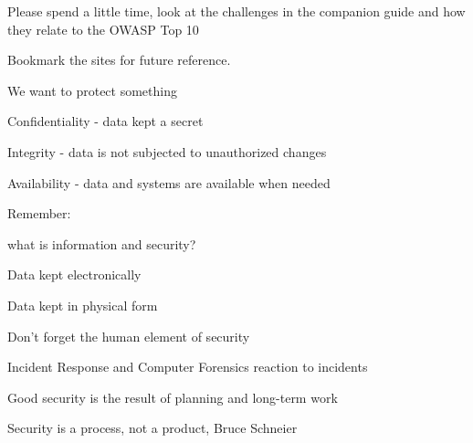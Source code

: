 \documentclass[Screen16to9,17pt]{foils}
\begin{document}
Please spend a little time, look at the challenges in the companion guide and how they relate to the OWASP Top 10

Bookmark the sites for future reference.






\begin{list1}
\item We want to protect something
\item Confidentiality - data kept a secret
\item Integrity - data is not subjected to unauthorized changes
\item Availability - data and systems are available when needed
\end{list1}


\begin{list1}
\item Remember:
\begin{list2}
\item what is information and security?
\item Data kept electronically
\item Data kept in physical form
\item Don't forget the human element of security
\end{list2}
\item Incident Response and Computer Forensics reaction to incidents
\item Good security is the result of planning and long-term work
\end{list1}
\vskip 1cm
\centerline{\color{titlecolor}\LARGE Security is a process, not a product, Bruce Schneier}
\end{document}
